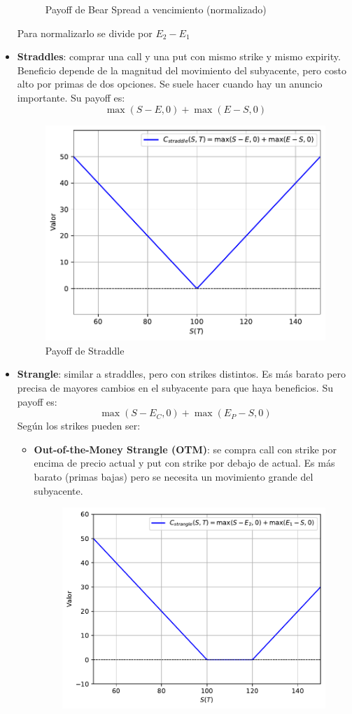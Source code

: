 \begin{itemize}
\begin{figure}[H]
        \caption{Payoff de Bear Spread a vencimiento (normalizado)}
    \end{figure}
    Para normalizarlo se divide por $E_2-E_1$
    \item \textbf{Straddles}: comprar una call y una put con mismo strike y mismo expirity. Beneficio depende de la magnitud del movimiento del subyacente, pero costo alto por primas de dos opciones. Se suele hacer cuando hay un anuncio importante. Su payoff es:
    \[\boxed{\max(S-E, 0) + \max(E-S, 0)}\]
    \begin{figure}[H]
        \centering
        \includegraphics[width=0.5\linewidth]{Imagenes/Parte1/2_Derivados/StraddlePayoff.pdf}
        \caption{Payoff de Straddle}
    \end{figure}
    \item \textbf{Strangle}: similar a straddles, pero con strikes distintos. Es más barato pero precisa de mayores cambios en el subyacente para que haya beneficios. Su payoff es:
    \[\boxed{\max(S-E_C, 0) + \max(E_P-S, 0)}\]
    Según los strikes pueden ser:
    \begin{itemize}
        \item \textbf{Out-of-the-Money Strangle (OTM)}: se compra call con strike por encima de precio actual y put con strike por debajo de actual. Es más barato (primas bajas) pero se necesita un movimiento grande del subyacente.
        \begin{figure}[H]
            \centering
            \includegraphics[width=0.5\linewidth]{Imagenes/Parte1/2_Derivados/StrangleOTMPayoff.pdf}

\end{figure}
\end{itemize}
\end{itemize}
